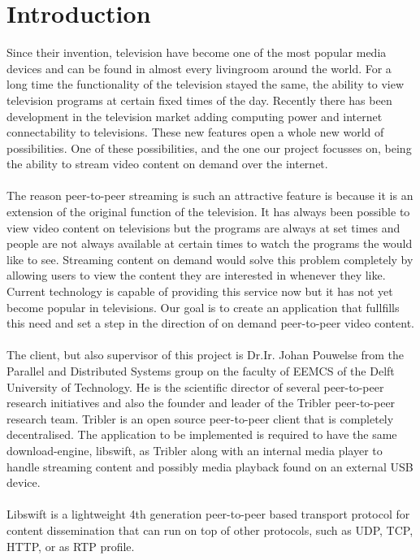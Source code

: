 \chapter{Introduction}
Since their invention, television have become one of the most popular media devices and can be found in almost every livingroom around the world. For a long time the functionality of the television stayed the same, the ability to view television programs at certain fixed times of the day. Recently there has been development in the television market adding computing power and internet connectability to televisions. These new features open a whole new world of possibilities. One of these possibilities, and the one our project focusses on, being the ability to stream video content on demand over the internet. 
\\\\
The reason peer-to-peer streaming is such an attractive feature is because it is an extension of the original function of the television. It has always been possible to view video content on televisions but the programs are always at set times and people are not always available at certain times to watch the programs the would like to see. Streaming content on demand would solve this problem completely by allowing users to view the content they are interested in whenever they like. Current technology is capable of providing this service now but it has not yet become popular in televisions. Our goal is to create an application that fullfills this need and set a step in the direction of on demand peer-to-peer video content.
\\\\
The client, but also supervisor of this project is Dr.Ir. Johan Pouwelse from the Parallel and Distributed Systems group on the faculty of EEMCS of the Delft University of Technology.
He is the scientific director of several peer-to-peer research initiatives and also the founder and leader of the Tribler peer-to-peer research team.
Tribler\cite{tribler} is an open source peer-to-peer client that is completely decentralised.
The application to be implemented is required to have the same download-engine, libswift,\cite{swift} as Tribler
along with an internal media player to handle streaming content and possibly media playback found on an external USB device.
\\\\
Libswift is a lightweight 4th generation peer-to-peer based transport protocol for content dissemination
that can run on top of other protocols, such as UDP, TCP, HTTP, or as RTP profile.
